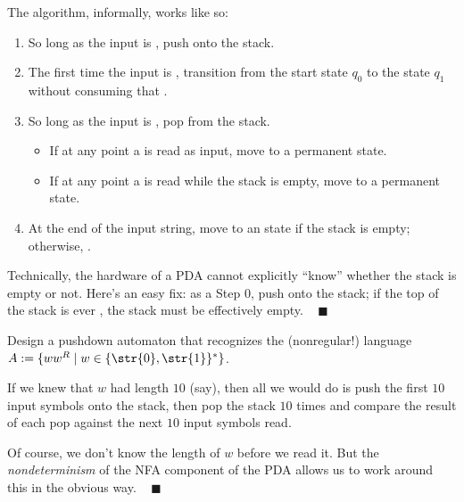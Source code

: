 \begin{solution}
    The algorithm, informally, works like so:
    \begin{enumerate}
        \item So long as the input is ,
        push  onto the stack.
        \item The first time the input is ,
        transition from the start state $q_0$ to the state $q_1$
        without consuming that .
        \item So long as the input is ,
        pop  from the stack.
        \begin{itemize}
            \item If at any point a  is read as input,
            move to a permanent  state.
            \item If at any point a  is read while the stack is empty,
            move to a permanent  state.
        \end{itemize}
        \item At the end of the input string,
        move to an  state if the stack is empty;
        otherwise, .
    \end{enumerate}
    Technically, the hardware of a PDA
    cannot explicitly ``know'' whether the stack is empty or not.
    Here's an easy fix:
    as a Step 0, push  onto the stack;
    if the top of the stack is ever ,
    the stack must be effectively empty.
    ~ $\blacksquare$
\end{solution}

\begin{problem}
    Design a pushdown automaton that recognizes the (nonregular!) language
    $A := \{ww^R \mid w \in \{\str{0}, \str{1}\}^*\}$.
\end{problem}

\begin{solution}
    If we knew that $w$ had length $10$ (say),
    then all we would do is push the first $10$ input symbols onto the stack,
    then pop the stack $10$ times and compare the result of each pop
    against the next $10$ input symbols read.

    Of course, we don't know the length of $w$ before we read it.
    But the \emph{nondeterminism} of the NFA component of the PDA
    allows us to work around this in the obvious way.
    ~ $\blacksquare$
\end{solution}

